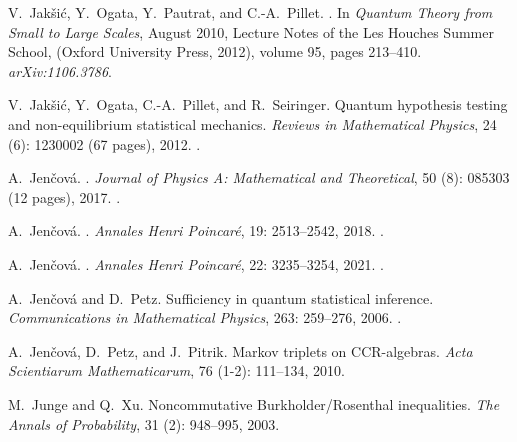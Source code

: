 \documentclass[12pt]{article}
\theoremstyle{definition}
\theoremstyle{remark}
\numberwithin{equation}{section}
\begin{document}
\begin{thebibliography}{27}
V.~Jak{\v{s}}i{\'c}, Y.~Ogata, Y.~Pautrat, and C.-A.~Pillet.
.
\newblock In \emph{Quantum Theory from Small to Large Scales}, August 2010,
Lecture Notes of the Les Houches Summer School,  (Oxford University Press, 2012),
volume 95, pages 213--410.
\newblock \emph{arXiv:1106.3786}.

V.~Jak{\v s}i{\'c}, Y.~Ogata, C.-A.~Pillet, and R.~Seiringer.
\newblock Quantum hypothesis testing and non-equilibrium statistical mechanics.
\newblock \emph{Reviews in Mathematical Physics}, 24 (6):
1230002 (67 pages), 2012.
\newblock {}.

A.~Jen{\v{c}}ov{\'a}.
.
\newblock \emph{Journal of Physics A: Mathematical and Theoretical}, 50
(8): 085303 (12 pages), 2017.
\newblock {}.

A.~Jen{\v c}ov{\'a}.
.
\newblock \emph{Annales Henri Poincar{\'e}}, 19: 2513--2542, 2018.
\newblock {}.

A.~Jen{\v{c}}ov{\'a}.
.
\newblock \emph{Annales Henri Poincar{\'e}}, 22: 3235–3254, 2021.
\newblock {}.

A.~Jen{\v c}ov{\'a} and D.~Petz.
\newblock Sufficiency in quantum statistical inference.
\newblock \emph{Communications in Mathematical Physics}, 263:
259--276, 2006.
\newblock {}.

A.~Jen{\v c}ov{\'a}, D.~Petz, and J.~Pitrik.
\newblock Markov triplets on CCR-algebras.
\newblock \emph{Acta Scientiarum Mathematicarum}, 76 (1-2):
111--134, 2010.

M.~Junge and Q.~Xu.
\newblock Noncommutative {B}urkholder/{R}osenthal inequalities.
\newblock \emph{The Annals of Probability}, 31 (2): 948--995,
  2003.


\end{thebibliography}
\end{document}
